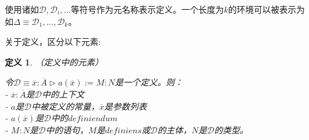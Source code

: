 \documentclass[UTF8]{article}
\newtheorem{thm}{定义}[section]
\begin{document}
		使用诸如$\mathcal{D},\mathcal{D}_i,...$等符号作为元名称表示定义。一个长度为$k$的环境可以被表示为如$\Delta\equiv\mathcal{D}_1,...,\mathcal{D}_k$。
		
		关于定义，区分以下元素:
		
		\begin{thm}（定义中的元素）
			
			\noindent
			令$\mathcal{D}\equiv\overline{x}:\overline{A}\triangleright a(\overline{x}):=M:N$是一个定义。则：\\
			- $\overline{x}:\overline{A}$是$\mathcal{D}$中的上下文\\
			- $a$是$\mathcal{D}$中被定义的常量，$\overline{x}$是参数列表\\
			- $a(\overline{x})$是$\mathcal{D}$中的$definiendum$\\
			- $M:N$是$\mathcal{D}$中的语句，$M$是$definiens$或$\mathcal{D}$的主体，$N$是$\mathcal{D}$的类型。
		\end{thm}
\end{document}
